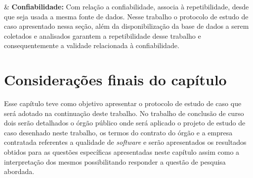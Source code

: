 \begin{easylist}[itemize]
\textcolor{red}{}


& \textbf{Confiabilidade: } Com relação a confiabilidade,  associa à repetibilidade, desde que seja usada a mesma fonte de dados. Nesse trabalho o protocolo de estudo de caso apresentado nessa seção, além da disponibilização da base de dados a serem coletados e analisados garantem a repetibilidade desse trabalho e consequentemente a validade relacionada à confiabilidade.

\end{easylist}	


\section{Considerações finais do capítulo}

Esse capítulo teve como objetivo apresentar o protocolo de estudo de caso que será adotado na continuação deste trabalho. No trabalho de conclusão de curso dois serão detalhados o órgão público onde será aplicado o projeto de estudo de caso desenhado neste trabalho, os termos do contrato do órgão e a empresa contratada referentes a qualidade de \textit{software} e serão apresentados os resultados obtidos para as questões específicas apresentadas neste capítulo assim como a interpretação dos mesmos possibilitando responder a questão de pesquisa abordada.  